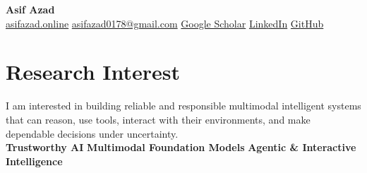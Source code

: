 \documentclass[10pt,letterpaper]{article}
\makeatletter
\newenvironment{entry}
    {\begin{minipage}{\linewidth}\color{textColor}}
    {\end{minipage}}
\newcommand{\daterow}[3]{%
    \begin{tabularx}{\linewidth}{@{}X>{\raggedleft\arraybackslash}p{3.8cm}@{}}
        #1 & \textcolor{mutedColor}{#2}\\
        #3 &
    \end{tabularx}
}
\makeatother
\begin{document}
\begin{center}
    {\fontsize{22pt}{25pt}\selectfont\bfseries\color{primaryColor} Asif Azad}\\[0.32em]
    \href{https://asifazad.online/}{asifazad.online}
    \enspace\textcolor{mutedColor}{\textbar}\enspace
    \href{mailto:asifazad0178@gmail.com}{asifazad0178@gmail.com}
    \enspace\textcolor{mutedColor}{\textbar}\enspace
    \href{https://scholar.google.com/citations?user=nDhZSTQAAAAJ}{Google Scholar}
    \enspace\textcolor{mutedColor}{\textbar}\enspace
    \href{https://www.linkedin.com/in/asifazad2677}{LinkedIn}
    \enspace\textcolor{mutedColor}{\textbar}\enspace
    \href{https://github.com/BRAINIAC2677}{GitHub}
\end{center}
\vspace{-0.35em}

\section{Research Interest}
\begin{entry}
I am interested in building reliable and responsible multimodal intelligent systems that can reason, use tools, interact with their environments, and make dependable decisions under uncertainty.\\[0.38em]
\textbf{Trustworthy AI}
\enspace\textcolor{primaryColor}{\textbullet}\enspace
\textbf{Multimodal Foundation Models}
\enspace\textcolor{primaryColor}{\textbullet}\enspace
\textbf{Agentic \& Interactive Intelligence}
\end{entry}

\newcommand{\educationsection}{%
\section{Education}
\begin{entry}
\daterow
    {\textbf{Bangladesh University of Engineering and Technology (BUET)}}
    {Feb 2020 -- Mar 2025}
    {B.Sc. in Computer Science and Engineering}
\vspace{0.16em}
\textbf{CGPA:} 3.91/4.00
\enspace\textcolor{mutedColor}{\textbar}\enspace
\textbf{Top 10\%}
\enspace\textcolor{mutedColor}{\textbar}\enspace
\textbf{Dean's List:} three consecutive years\\[0.28em]
\textbf{Undergraduate thesis:}
\href{https://link.springer.com/chapter/10.1007/978-3-032-00652-3_3}{\textit{Beyond Accuracy: Enhancing Parkinson's Diagnosis with Uncertainty Quantification of Machine Learning Models}}\\[0.28em]
\textbf{Supervisor:} \href{https://cse.buet.ac.bd/faculty/faculty_detail/mrahman}{Prof. M Saifur Rahman}
\enspace\textcolor{mutedColor}{\textbar}\enspace
\textbf{Best Paper Award nominee}, AI in Healthcare Conference (AIiH) 2025
\end{entry}
}
\end{document}
